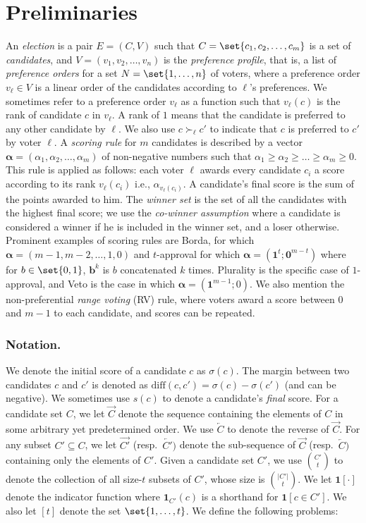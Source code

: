 \documentclass[letterpaper]{article} %
\newcommand{\indic}{\mathbf{1}}
\newcommand{\vecc}{\mathbf}
\newcommand{\vecgreek}{\bm}
\newcommand{\veca}{\vecgreek{\alpha}}
\newcommand{\ora}[1]{\overrightarrow{#1}}
\newcommand{\ola}[1]{\overleftarrow{#1}}
\newcommand{\abs}[1]{\lvert{#1}\rvert}
\newcommand{\diff}{\mathrm{diff}}
\begin{document}
\section{Preliminaries}
An \emph{election} is a pair $E=(C, V)$ such that $C=\set{c_1, c_2, \ldots, c_m}$ is a set of \emph{candidates}, and  $V = \left(v_1, v_2, \ldots, v_n\right)$ is the \emph{preference profile}, that is, a list of \emph{preference orders} for a set $N=\set{1,\ldots,n}$ of voters, where a preference order $v_\ell \in V$ is a linear order of the candidates according to $\ell$'s preferences.
 We sometimes refer to a preference order $v_\ell$ as a function such that $v_\ell(c)$ is the rank of candidate $c$ in $v_\ell$. A rank of $1$ means that the candidate is preferred to any other candidate by $\ell$. We also use $c \succ_\ell c'$ to indicate that $c$ is preferred to $c'$ by voter $\ell$.
A \emph{scoring rule} for $m$ candidates is described by a vector $\veca=\left(\alpha_1,\alpha_2,\ldots,\alpha_m\right)$ of non-negative numbers such that $\alpha_1 \geq \alpha_2 \geq \dots \geq \alpha_m \geq 0$.
This rule is applied as follows: each voter $\ell$ awards every candidate $c_i$ a score according to its rank $v_\ell(c_i)$ i.e., $\alpha_{v_\ell(c_i)}$. A candidate's final score is the sum of the points awarded to him.
The \emph{winner set} is the set of all the candidates with the highest final score; we use the \emph{co-winner assumption} where a candidate is considered a winner if he is included in the winner set, and a loser otherwise. Prominent examples of scoring rules are  Borda, for which  $\veca=(m-1,m-2,\ldots,1,0)$ and $t$-approval for which $\veca=(\vecc{1}^t;\vecc{0}^{m-t})$ where for $b \in \set{0,1}$,  $\vecc{b}^{k}$  is $b$ concatenated $k$ times.
Plurality is the specific case of $1$-approval, and Veto is the case in which $\veca=(\vecc{1}^{m-1};0)$.
We also mention the non-preferential \emph{range voting} (RV)  rule, where voters award a score between $0$ and $m-1$ to each candidate, and scores can be repeated.
\subsubsection{Notation.} We denote the initial score of a candidate $c$ as $\sigma(c)$. The margin between two candidates $c$ and $c'$ is denoted as $\diff(c,c') = \sigma(c) - \sigma(c')$  (and can be negative). We sometimes use $s(c)$ to denote a candidate's \emph{final} score.
For a candidate set $C$, we let $\ora{C}$ denote the sequence containing the elements of $C$ in some arbitrary yet predetermined order. We use  $\ola{C}$ to denote the reverse of $\ora{C}$. For any subset $C' \subseteq C$, we let $\ora{C'}$ (resp.\ $\ola{C'})$ denote the sub-sequence of $\ora{C}$ (resp.\ $\ola{C})$ containing only the elements of $C'$.
Given a candidate set $C'$, we use $\binom{C'}{t}$ to denote the collection of all size-$t$ subsets of $C'$, whose size is $\binom{\abs{C'}}{t}$. We let $\indic[\cdot]$ denote the indicator function where $\indic_{C'}(c)$ is a shorthand for $\indic[c \in C']$.
We also let $[t]$ denote the set $\set{1,\ldots,t}$.
We define the following problems:
\end{document}
